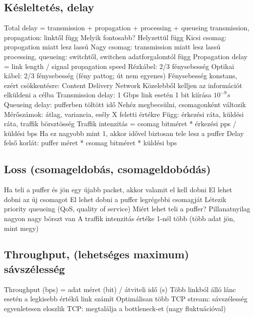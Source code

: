 \documentclass[12pt,a4paper]{article}
\begin{document}
\subsection{Késleltetés, delay}

\begin{outline}
	\1 Total delay = transmission + propagation + processing + queueing
		\2 transmission, propagation: linktől függ
			\3 Melyik fontosabb? Helyzettül függ
			\3 Kicsi csomag: propogation miatt lesz lassú
			\3 Nagy csomag: transmission miatt lesz lassú
		\2 processing, queueing: switchtől, switchen adatforgalomtól függ
	\1 Propagation delay = link length / signal propagation speed
		\2 Rézkábel: 2/3 fénysebesség
		\2 Optikai kábel: 2/3 fénysebesség (fény pattog; út nem egyenes)
		\2 Fénysebesség konstans, ezért csökkentésre: Content Delivery Network
			\3 Közelebből kelljen az információt elküldeni a célba
	\1 Transmission delay: 1 Gbps link esetén 1 bit kiírása $10^{-9}s$
	\1 Queueing delay: pufferben töltött idő
		\2 Nehéz megbecsülni, csomagonként változik
		\2 Mérőszámok: átlag, variancia, esély X feletti értékre
		\2 Függ: érkezési ráta, küldési ráta, traffik börsztösség
		\2 Traffik intenzitás = csomag bitméret * érkezési pps / küldési bps
			\3 Ha ez nagyobb mint 1, akkor idővel biztosan tele lesz a puffer
		\2 Delay felső korlát: puffer méret * csomag bitméret * küldési bps
\end{outline}

\pagebreak

\subsection{Loss (csomageldobás, csomageldobódás)}

\begin{outline}
	\1 Ha teli a puffer és jön egy újabb packet, akkor valamit el kell dobni
		\2 El lehet dobni az új csomagot
		\2 El lehet dobni a puffer legrégebbi csomagját
		\2 Létezik priority queueing (QoS, quality of service)
	\1 Miért lehet teli a puffer?
		\2 Pillanatnyilag nagyon nagy börszt van
		\2 A traffik intenzitás értéke 1-nél több (több adat jön, mint megy)
\end{outline}

\subsection{Throughput, (lehetséges maximum) sávszélesség}

\begin{outline}
	\1 Throughput (bps) = adat méret (bit) / átviteli idő (s)
		\2 Több linkból álló lánc esetén a legkisebb értékű link számít
		\2 Optimálisan több TCP stream: sávszélesség egyenletesen eloszlik
		\2 TCP: megtalálja a bottleneck-et (nagy fluktuációval)
\end{outline}
\end{document}
